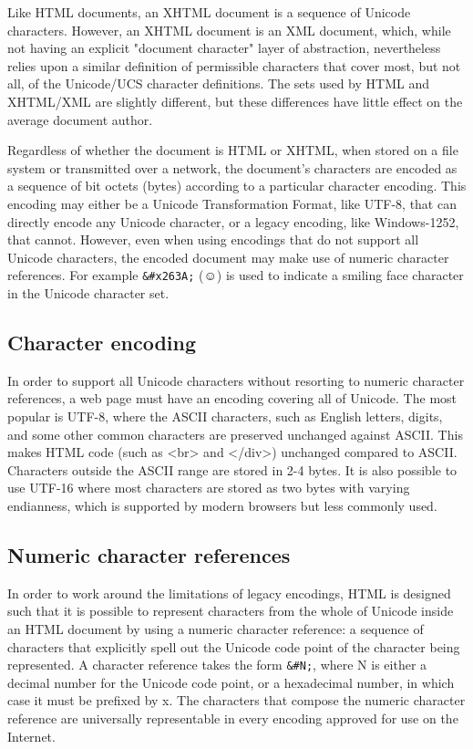 Like HTML documents, an XHTML document is a sequence of Unicode characters. However, an XHTML document is an XML document, which, while not having an explicit "document character" layer of abstraction, nevertheless relies upon a similar definition of permissible characters that cover most, but not all, of the Unicode/UCS character definitions. The sets used by HTML and XHTML/XML are slightly different, but these differences have little effect on the average document author.

Regardless of whether the document is HTML or XHTML, when stored on a file system or transmitted over a network, the document's characters are encoded as a sequence of bit octets (bytes) according to a particular character encoding. This encoding may either be a Unicode Transformation Format, like UTF-8, that can directly encode any Unicode character, or a legacy encoding, like Windows-1252, that cannot. However, even when using encodings that do not support all Unicode characters, the encoded document may make use of numeric character references. For example \texttt{\&\#x263A;} (☺) is used to indicate a smiling face character in the Unicode character set.


\subsection{Character encoding}

In order to support all Unicode characters without resorting to numeric character references, a web page must have an encoding covering all of Unicode. The most popular is UTF-8, where the ASCII characters, such as English letters, digits, and some other common characters are preserved unchanged against ASCII. This makes HTML code (such as <br> and </div>) unchanged compared to ASCII. Characters outside the ASCII range are stored in 2-4 bytes. It is also possible to use UTF-16 where most characters are stored as two bytes with varying endianness, which is supported by modern browsers but less commonly used.




\subsection{Numeric character references}

In order to work around the limitations of legacy encodings, HTML is designed such that it is possible to represent characters from the whole of Unicode inside an HTML document by using a numeric character reference: a sequence of characters that explicitly spell out the Unicode code point of the character being represented. A character reference takes the form \texttt{\&\#N;}, where N is either a decimal number for the Unicode code point, or a hexadecimal number, in which case it must be prefixed by x. The characters that compose the numeric character reference are universally representable in every encoding approved for use on the Internet.


